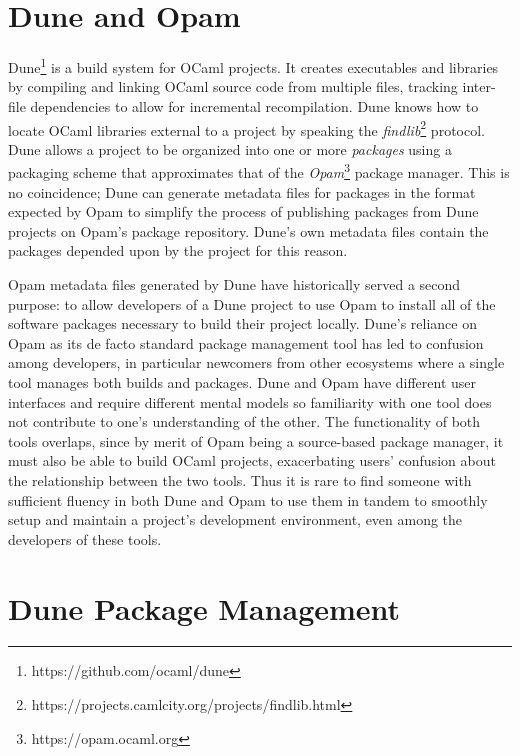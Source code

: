 \documentclass{article}
\begin{document}
    \begin{multicols}{2}

        \section{Dune and Opam}

        Dune\footnote{https://github.com/ocaml/dune} is a build system for OCaml
        projects. It creates executables and libraries by compiling and linking
        OCaml source code from multiple files, tracking inter-file dependencies
        to allow for incremental recompilation. Dune knows how to locate OCaml
        libraries external to a project by speaking the
        \textit{findlib}\footnote{https://projects.camlcity.org/projects/findlib.html}
        protocol. Dune allows a project to be organized into one or more
        \textit{packages} using a packaging scheme that approximates that of the
        \textit{Opam}\footnote{https://opam.ocaml.org} package manager. This is
        no coincidence; Dune can generate metadata files for packages in the
        format expected by Opam to simplify the process of publishing packages
        from Dune projects on Opam's package repository. Dune's own metadata
        files contain the packages depended upon by the project for this reason.

        Opam metadata files generated by Dune have historically served a second
        purpose: to allow developers of a Dune project to use Opam to install
        all of the software packages necessary to build their project locally.
        Dune's reliance on Opam as its de facto standard package management tool
        has led to confusion among developers, in particular newcomers from
        other ecosystems where a single tool manages both builds and packages.
        Dune and Opam have different user interfaces and require different
        mental models so familiarity with one tool does not contribute to one's
        understanding of the other. The functionality of both tools overlaps,
        since by merit of Opam being a source-based package manager, it must
        also be able to build OCaml projects, exacerbating users' confusion
        about the relationship between the two tools. Thus it is rare to find
        someone with sufficient fluency in both Dune and Opam to use them in
        tandem to smoothly setup and maintain a project's development
        environment, even among the developers of these tools.

        \section {Dune Package Management}


\end{multicols}
\end{document}
